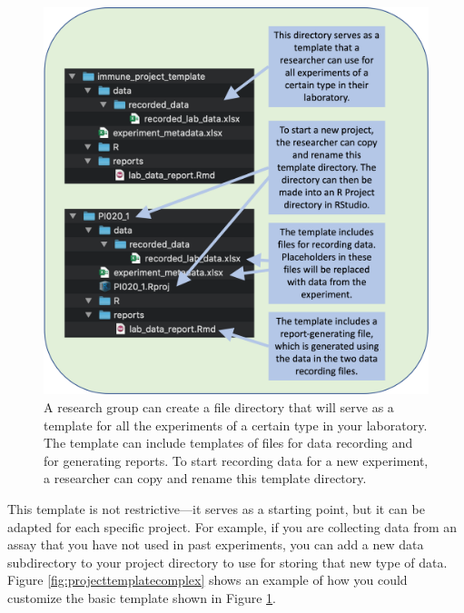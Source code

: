 \documentclass[]{tufte-book}
\begin{document}
\begin{figure}
\includegraphics[width=\textwidth]{figures/project_template_directory} \caption[A research group can create a file directory that will serve as a template for all the experiments of a certain type in your laboratory]{A research group can create a file directory that will serve as a template for all the experiments of a certain type in your laboratory. The template can include templates of files for data recording and for generating reports. To start recording data for a new experiment, a researcher can copy and rename this template directory.}\label{fig:templatedirectory}
\end{figure}

This template is not restrictive---it serves as a starting point, but it can
be adapted for each specific project. For example, if you are collecting
data from an assay that you have not used in past experiments, you can add
a new data subdirectory to your project directory to use for storing that new
type of data. Figure \ref{fig:projecttemplatecomplex} shows an example of
how you could customize the basic template shown in Figure \ref{fig:templatedirectory}.
\end{document}
